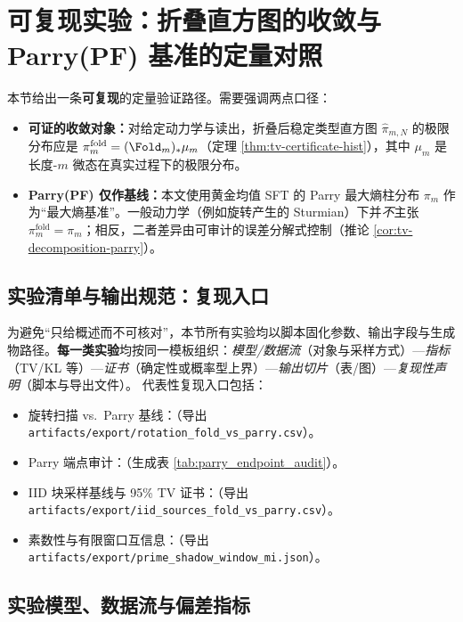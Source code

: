 \section{可复现实验：折叠直方图的收敛与 Parry(PF) 基准的定量对照}\label{sec:experiments}

本节给出一条\textbf{可复现}的定量验证路径。需要强调两点口径：
\begin{itemize}
  \item \textbf{可证的收敛对象：}对给定动力学与读出，折叠后稳定类型直方图 $\hat{\pi}_{m,N}$ 的极限分布应是 $\pi_m^{\mathrm{fold}}=(\Fold_m)_*\mu_m$（定理 \ref{thm:tv-certificate-hist}），其中 $\mu_m$ 是长度-$m$ 微态在真实过程下的极限分布。
  \item \textbf{Parry(PF) 仅作基线：}本文使用黄金均值 SFT 的 Parry 最大熵柱分布 $\pi_m$ 作为“最大熵基准”。一般动力学（例如旋转产生的 Sturmian）下并\emph{不}主张 $\pi_m^{\mathrm{fold}}=\pi_m$；相反，二者差异由可审计的误差分解式控制（推论 \ref{cor:tv-decomposition-parry}）。
\end{itemize}

\subsection{实验清单与输出规范：复现入口}\label{subsec:experiments-manifest}
为避免“只给概述而不可核对”，本节所有实验均以脚本固化参数、输出字段与生成物路径。\textbf{每一类实验}均按同一模板组织：\emph{模型/数据流}（对象与采样方式）—\emph{指标}（TV/KL 等）—\emph{证书}（确定性或概率型上界）—\emph{输出切片}（表/图）—\emph{复现性声明}（脚本与导出文件）。
代表性复现入口包括：
\begin{itemize}
  \item 旋转扫描 vs.\ Parry 基线：（导出 \texttt{artifacts/export/rotation\_fold\_vs\_parry.csv}）。
  \item Parry 端点审计：（生成表 \ref{tab:parry_endpoint_audit}）。
  \item IID 块采样基线与 95\% TV 证书：（导出 \texttt{artifacts/export/iid\_sources\_fold\_vs\_parry.csv}）。
  \item 素数性与有限窗口互信息：（导出 \texttt{artifacts/export/prime\_shadow\_window\_mi.json}）。
\end{itemize}

\subsection{实验模型、数据流与偏差指标}

